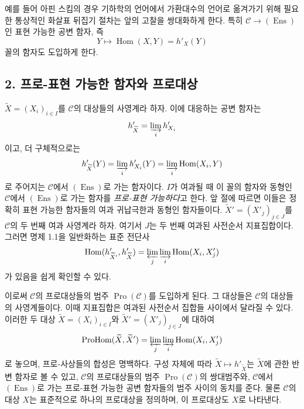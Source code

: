 \documentclass[11pt,twoside,openany]{book}
\numberwithin{equation}{section}
\newcommand{\sourceunit}{front}
\newcommand{\src}[1]{%
  \phantomsection\hypertarget{src:\sourceunit:#1}{}%
  \marginpar{\raggedleft\footnotesize\sffamily #1}%
}
\theoremstyle{plain}
\theoremstyle{definition}
\theoremstyle{remark}
\begin{document}
\src{371}

예를 들어 아핀 스킴의 경우 기하학의 언어에서 가환대수의 언어로
옮겨가기 위해 필요한 통상적인 화살표 뒤집기 절차는 앞의 고찰을
쌍대화하게 한다. 특히 $\mathcal C\longrightarrow(\operatorname{Ens})$인
표현 가능한 공변 함자, 즉
\[
  Y\longmapsto\operatorname{Hom}(X,Y)=h'_X(Y)
\]
꼴의 함자도 도입하게 한다.

\subsection*{2. 프로-표현 가능한 함자와 프로대상}

$\widetilde X=(X_i)_{i\in I}$를 $\mathcal C$의 대상들의 사영계라 하자.
이에 대응하는 공변 함자는
\[
  h'_{\widetilde X}=\varinjlim_i h'_{X_i}
\]
이고, 더 구체적으로는
\[
  h'_{\widetilde X}(Y)=\varinjlim_i h'_{X_i}(Y)
  =\varinjlim_i\operatorname{Hom}(X_i,Y)
\]
로 주어지는 $\mathcal C$에서 $(\operatorname{Ens})$로 가는 함자이다.
$I$가 여과될 때 이 꼴의 함자와 동형인 $\mathcal C$에서
$(\operatorname{Ens})$로 가는 함자를 \emph{프로-표현 가능하다}고 한다.
앞 절에 따르면 이들은 정확히 표현 가능한 함자들의 여과 귀납극한과
동형인 함자들이다. $\widetilde X'=(X'_j)_{j\in J}$를 $\mathcal C$의 두
번째 여과 사영계라 하자. 여기서 $J$는 두 번째 여과된 사전순서
지표집합이다. 그러면 명제 1.1을 일반화하는 표준 전단사
\[
  \operatorname{Hom}(h'_{\widetilde X'},h'_{\widetilde X})
  =\varprojlim_j\varinjlim_i\operatorname{Hom}(X_i,X'_j)
\]
가 있음을 쉽게 확인할 수 있다.

이로써 $\mathcal C$의 프로대상들의 범주
$\operatorname{Pro}(\mathcal C)$를 도입하게 된다. 그 대상들은
$\mathcal C$의 대상들의 사영계들이다. 이때 지표집합은 여과된 사전순서
집합들 사이에서 달라질 수 있다. 이러한 두 대상
$\widetilde X=(X_i)_{i\in I}$와
$\widetilde X'=(X'_j)_{j\in J}$에 대하여
\[
  \operatorname{ProHom}(\widetilde X,\widetilde X')
  =\varprojlim_j\varinjlim_i\operatorname{Hom}(X_i,X'_j)
\]
로 놓으며, 프로-사상들의 합성은 명백하다. 구성 자체에 따라
$\widetilde X\longmapsto h'_{\widetilde X}$는 $\widetilde X$에 관한 반변
함자로 볼 수 있고, $\mathcal C$의 프로대상들의 범주
$\operatorname{Pro}(\mathcal C)$의 쌍대범주와, $\mathcal C$에서
$(\operatorname{Ens})$로 가는 프로-표현 가능한 공변 함자들의 범주 사이의
동치를 준다. 물론 $\mathcal C$의 대상 $X$는 표준적으로 하나의 프로대상을
정의하며, 이 프로대상도 $X$로 나타낸다.
\end{document}
